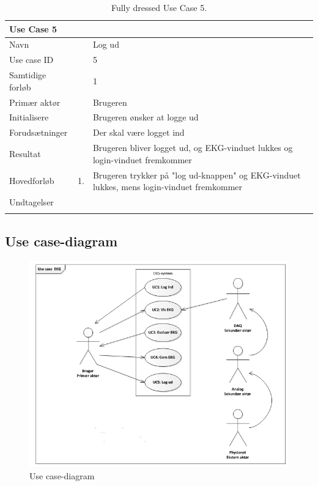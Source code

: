\begin{longtabu} to  %
    {\large \textbf{Use Case 5}} && \\
    \toprule
    Navn &&    Log ud\\
    Use case ID &&    5\\
    Samtidige forløb &&    1\\
    Primær aktør &&    Brugeren\\
    Initialisere &&    Brugeren ønsker at logge ud\\
    Forudsætninger &&  Der skal være logget ind\\
    Resultat &&    Brugeren bliver logget ud, og EKG-vinduet lukkes og login-vinduet fremkommer                     \\ \midrule
    Hovedforløb &    1. &    Brugeren trykker på "log ud-knappen" og EKG-vinduet lukkes, mens login-vinduet fremkommer 
    \\ \midrule
    Undtagelser & &
         \\ \bottomrule
\caption{Fully dressed Use Case 5.}
\label{UC5}
\end{longtabu}


\subsection{Use case-diagram}

\begin{figure}[htb]
	\centering
	\includegraphics[width=1\textwidth]{Figurer/Snip20150327_24}
	\caption{Use case-diagram}
	\label{fig:Use Cases}
\end{figure}

